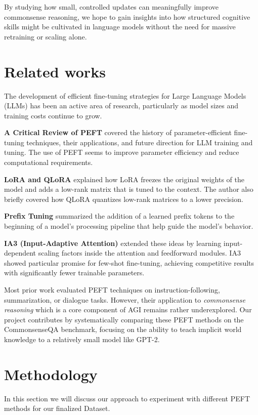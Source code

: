 \documentclass[11pt,twocolumn]{article}
\begin{document}
By studying how small, controlled updates can meaningfully improve commonsense reasoning, we hope to gain insights into how structured cognitive skills might be cultivated in language models without the need for massive retraining or scaling alone.



\section{Related works}
\label{sec:background}

The development of efficient fine-tuning strategies for Large Language Models (LLMs) has been an active area of research, particularly as model sizes and training costs continue to grow.

\textbf{A Critical Review of PEFT} \cite{Xu2023} covered the history of parameter-efficient fine-tuning techniques, their applications, and future direction for LLM training and tuning. The use of PEFT seems to improve parameter efficiency and reduce computational requirements.

\textbf{LoRA and QLoRA} \cite{Noble2023} explained how LoRA freezes the original weights of the model and adds a low-rank matrix that is tuned to the context. The author also briefly covered how QLoRA quantizes low-rank matrices to a lower precision.  

\textbf{Prefix Tuning} \cite{Razavi2023} summarized the addition of a learned prefix tokens to the beginning of a model's processing pipeline that help guide the model's behavior.

\textbf{IA3 (Input-Adaptive Attention)} \cite{Liu2022} extended these ideas by learning input-dependent scaling factors inside the attention and feedforward modules. IA3 showed particular promise for few-shot fine-tuning, achieving competitive results with significantly fewer trainable parameters.

Most prior work evaluated PEFT techniques on instruction-following, summarization, or dialogue tasks. However, their application to \textit{commonsense reasoning} which is a core component of AGI remains rather underexplored. Our project contributes by systematically comparing these PEFT methods on the CommonsenseQA benchmark, focusing on the ability to teach implicit world knowledge to a relatively small model like GPT-2.



\section{Methodology}
\label{sec:methodology}
In this section we will discuss our approach to experiment with different PEFT methods for our finalized Dataset.
\end{document}
